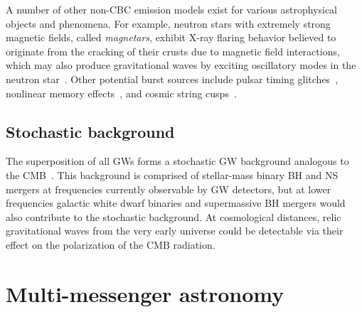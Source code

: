 A number of other non-CBC emission models exist for various astrophysical objects and phenomena.
For example, neutron stars with extremely strong magnetic fields, called \textit{magnetars}, exhibit X-ray flaring behavior believed to originate from the cracking of their crusts due to magnetic field interactions, which may also produce gravitational waves by exciting oscillatory modes in the neutron star~\citep{Lasky_2015}.
Other potential burst sources include pulsar timing glitches~\citep{pulsar_s5}, nonlinear memory effects~\citep{memory_o2}, and cosmic string cusps~\citep{strings_o3}.


\subsection{Stochastic background}

The superposition of all \acp{GW} forms a stochastic \ac{GW} background analogous to the \ac{CMB}~\citep{Christensen_2018}.
This background is comprised of stellar-mass binary \ac{BH} and \ac{NS} mergers at frequencies currently observable by \ac{GW} detectors, but at lower frequencies galactic white dwarf binaries and supermassive BH mergers would also contribute to the stochastic background.
At cosmological distances, relic gravitational waves from the very early universe could be detectable via their effect on the polarization of the \ac{CMB} radiation.


\section{Multi-messenger astronomy}\label{sec:mma}

